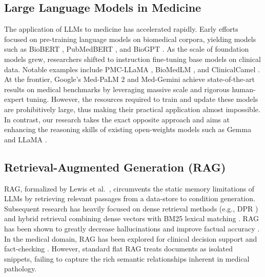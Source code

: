 \documentclass[a4paper,fleqn]{cas-sc}
\begin{document}
\subsection{Large Language Models in Medicine}
The application of LLMs to medicine has accelerated rapidly. Early efforts focused on pre-training language models on biomedical corpora, yielding models such as BioBERT \cite{lee2020biobert}, PubMedBERT \cite{gu2021pubmedbert}, and BioGPT \cite{luo2022biogpt}. As the scale of foundation models grew, researchers shifted to instruction fine-tuning base models on clinical data. Notable examples include PMC-LLaMA \cite{wu2023pmcllama}, BioMedLM \cite{bolton2022biomedlm}, and ClinicalCamel \cite{toma2023clinicalcamel}. At the frontier, Google's Med-PaLM 2 \cite{singhal2023medpalm2} and Med-Gemini \cite{saab2024gemini} achieve state-of-the-art results on medical benchmarks by leveraging massive scale and rigorous human-expert tuning. However, the resources required to train and update these models are prohibitively large, thus making their practical application almost impossible. In contrast, our research takes the exact opposite approach and aims at enhancing the reasoning skills of existing open-weights models such as Gemma \cite{gemma2024} and LLaMA \cite{touvron2023llama}.

\subsection{Retrieval-Augmented Generation (RAG)}
RAG, formalized by Lewis et al.\ \cite{lewis2021rag}, circumvents the static memory limitations of LLMs by retrieving relevant passages from a data-store to condition generation. Subsequent research has heavily focused on dense retrieval methods (e.g., DPR \cite{karpukhin2020dpr}) and hybrid retrieval combining dense vectors with BM25 lexical matching \cite{robertson1994bm25}. RAG has been shown to greatly decrease hallucinations and improve factual accuracy \cite{gao2023enabling,qi2024model,shuster2021retrieval}. In the medical domain, RAG has been explored for clinical decision support and fact-checking \cite{xiong2024benchmarking,long2024bailicai}. However, standard flat RAG treats documents as isolated snippets, failing to capture the rich semantic relationships inherent in medical pathology.
\end{document}
